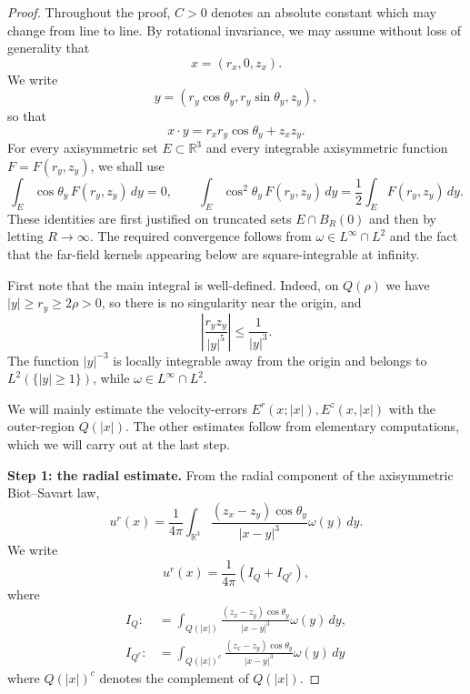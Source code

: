 \documentclass[reqno,11pt]{amsart}
\begin{document}
\begin{proof}
Throughout the proof, \(C>0\) denotes an absolute constant which may change
from line to line. By rotational invariance, we may assume without loss of
generality that
\[
    x=(r_x,0,z_x).
\]
We write
\[
    y=(r_y\cos\theta_y,r_y\sin\theta_y,z_y),
\]
so that
\[
    x\cdot y=r_xr_y\cos\theta_y+z_xz_y.
\]
For every axisymmetric set \(E\subset\mathbb R^3\) and every integrable
axisymmetric function \(F=F(r_y,z_y)\), we shall use
\begin{equation}
\label{eq:angular_cancel_conefree}
    \int_E \cos\theta_y\,F(r_y,z_y)\,dy=0,
    \qquad
    \int_E \cos^2\theta_y\,F(r_y,z_y)\,dy
    =
    \frac12\int_E F(r_y,z_y)\,dy .
\end{equation}
These identities are first justified on truncated sets \(E\cap B_R(0)\) and
then by letting \(R\to\infty\). The required convergence follows from
\(\omega\in L^\infty\cap L^2\) and the fact that the far-field kernels appearing
below are square-integrable at infinity.

First note that the main integral is well-defined. Indeed, on \(Q(\rho)\) we have
\(|y|\ge r_y\ge2\rho>0\), so there is no singularity near the origin, and
\[
    \left|\frac{r_yz_y}{|y|^5}\right|
    \le \frac{1}{|y|^3}.
\]
The function \(|y|^{-3}\) is locally integrable away from the origin and belongs
to \(L^2(\{|y|\ge1\})\), while \(\omega\in L^\infty\cap L^2\).

We will mainly estimate the velocity-errors $E^r(x;|x|), E^z(x,|x|)$ with the outer-region $Q(|x|)$. The other estimates follow from elementary computations, which we will carry out at the last step.

\medskip
\noindent\textbf{Step 1: the radial estimate.}
From the radial component of the axisymmetric Biot--Savart law,
\[
    u^r(x)
    =
    \frac{1}{4\pi}
    \int_{\mathbb R^3}
    \frac{(z_x-z_y)\cos\theta_y}{|x-y|^3}\omega(y) \,dy.
\]
We write
\[
    u^r(x)=\frac{1}{4\pi}(I_{Q}+I_{Q^c}),
\]
where
\begin{align*}
    I_{Q}
    :&=
    \int_{Q(|x|)}
    \frac{(z_x-z_y)\cos\theta_y}{|x-y|^3} \omega(y) \,dy,
    \\
    I_{Q^c}
    :&=
    \int_{Q(|x|)^c}
    \frac{(z_x-z_y)\cos\theta_y}{|x-y|^3}\omega(y)\,dy
\end{align*}
where $Q(|x|)^c$ denotes the complement of $Q(|x|)$.


\end{proof}
\end{document}
